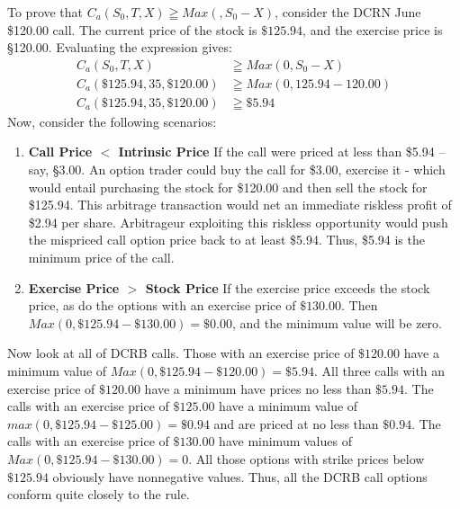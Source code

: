 \documentclass{book}
\theoremstyle{definition}
\theoremstyle{remark}
\begin{document}
            To prove that $C_a(S_0, T, X) \geqq Max(, S_0 - X)$, consider the DCRN June \$120.00 call. The current price of the stock is $\$125.94$, and the exercise price is \S120.00. Evaluating the expression gives:
                \begin{align*}
                    C_a(S_0, T, X) & \geqq Max(0, S_0 - X) \\ 
                    C_a(\$125.94, 35, \$120.00) & \geqq Max(0, 125.94-120.00) \\
                    C_a(\$125.94, 35, \$120.00) & \geqq \$5.94
                \end{align*}
            Now, consider the following scenarios: 
                \begin{enumerate}
                    \item \textbf{Call Price $<$ Intrinsic Price}
                        If the call were priced at less than \$5.94 --say, \S3.00. An option trader could buy the call for \$3.00, exercise it - which would entail purchasing the stock for \$120.00 and then sell the stock for \$125.94. This arbitrage transaction would net an immediate riskless profit of \$2.94 per share. Arbitrageur exploiting this riskless opportunity would push the mispriced call option price back to at least \$5.94. Thus, \$5.94 is the minimum price of the call.
                                
                    \item \textbf{Exercise Price $>$ Stock Price}
                        If the exercise price exceeds the stock price, as do the options with an exercise price of $\$130.00$. Then $Max(0, \$125.94 - \$130.00) = \$0.00$, and the minimum value will be zero. 
                \end{enumerate}
        
            
            Now look at all of DCRB calls. Those with an exercise price of $\$120.00$ have a minimum value of $Max(0, \$125.94 - \$120.00) = \$5.94 $. All three calls with an exercise price of $\$120.00$ have a minimum have prices no less than $\$5.94$. The calls with an exercise price of $\$125.00$ have a minimum value of $max(0, \$125.94 -\$125.00) = \$0.94$ and are priced at no less than $\$0.94$. The calls with an exercise price of $\$130.00$ have minimum values of $Max(0, \$125.94 - \$130.00) = 0$. All those options with strike prices below $\$125.94$ obviously have nonnegative values. Thus, all the DCRB call options conform quite closely to the rule. 
            
\end{document}

